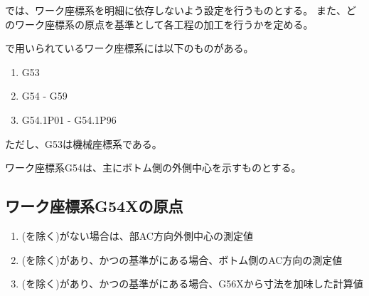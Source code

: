 

\DMC では、ワーク座標系を明細に依存しないよう設定を行うものとする。
また、どのワーク座標系の原点を基準として各工程の加工を行うかを定める。


\DMC で用いられているワーク座標系には以下のものがある。
\begin{enumerate}[label*=\sarrow]
\item {\ttfamily G53}
\item {\ttfamily G54} - {\ttfamily G59}
\item {\ttfamily G54.1\;P01} - {\ttfamily G54.1\;P96}
\end{enumerate}
ただし、{\ttfamily G53}は機械座標系である。



ワーク座標系{\ttfamily G54}は、主にボトム側の外側中心を示すものとする。


\subsection{ワーク座標系{\ttfamily G54X}の原点}
\begin{enumerate}[label*=\sarrow]
\item \BottomOutcut(\BottomCurvedOutcut を除く)がない場合は、\BottomEndFace 部AC方向外側中心の測定値
\item \BottomOutcut(\BottomCurvedOutcut を除く)があり、かつ\OutcutCenter の基準が\BottomOutcut にある場合、ボトム側のAC方向\OutcutCenter の測定値
\item \BottomOutcut(\BottomCurvedOutcut を除く)があり、かつ\OutcutCenter の基準が\TopOutcut にある場合、{\ttfamily G56X}から\CenterlineEndFaceDif 寸法を加味した計算値
\end{enumerate}


